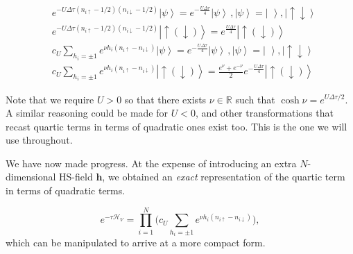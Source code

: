 \documentclass[10pt, twocolumn, twoside]{article}
\begin{document}
\begin{equation}
\begin{split}
&e^{-U \Delta\tau (n_{i\uparrow} - 1/2 ) (n_{i\downarrow} - 1/2 )} \left| \psi \right\rangle = e^{-\frac{U\Delta \tau}{4}} \left| \psi \right\rangle \, , \left| \psi \right\rangle = \left| \, \, \right\rangle, \left| \uparrow \downarrow \right\rangle \\
&e^{-U \Delta\tau (n_{i\uparrow} - 1/2 ) (n_{i\downarrow} - 1/2 )} \left| \uparrow (\downarrow) \right\rangle = e^{\frac{U\Delta \tau}{4}} \left| \uparrow (\downarrow) \right\rangle \\
&c_U \sum_{h_i = \pm 1} e^{\nu h_i (n_{i\uparrow} - n_{i\downarrow} )} \left| \psi \right\rangle = e^{-\frac{U\Delta \tau}{4}} \left| \psi \right\rangle \, , \left| \psi \right\rangle = \left| \, \, \right\rangle, \left| \uparrow \downarrow \right\rangle \\
&c_U \sum_{h_i = \pm 1} e^{\nu h_i (n_{i\uparrow} - n_{i\downarrow} )} \left| \uparrow (\downarrow) \right\rangle= \frac{e^\nu + e^{-\nu}}{2} e^{-\frac{U\Delta \tau}{4}}  \left| \uparrow (\downarrow) \right\rangle
\end{split}
\end{equation}

Note that we require $U > 0$ so that there exists $\nu \in \mathbb{R}$ such that $\cosh \nu = e^{U\Delta \tau / 2}$. A similar reasoning could be made for $U < 0$, and other transformations that recast quartic terms in terms of quadratic ones exist too. This is the one we will use throughout.

We have now made progress. At the expense of introducing an extra $N$-dimensional HS-field $\bm h$, we obtained an \emph{exact} representation of the quartic term in terms of quadratic terms.

\begin{equation} 
 e^{-\tau \mathcal{H}_V} = \prod_{i=1}^N \bigg( c_U \sum_{h_i = \pm 1} e^{\nu h_i ( n_{i\uparrow} - n_{i\downarrow} )} \bigg),
\end{equation} 
which can be manipulated to arrive at a more compact form.
\end{document}
